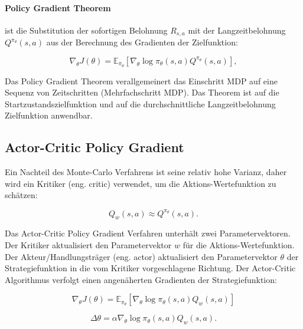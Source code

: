 \documentclass[conference]{IEEEtran}
\begin{document}
\paragraph*{Policy Gradient Theorem} ist die Substitution der sofortigen Belohnung $R_{s,a}$ mit der Langzeitbelohnung $Q^{\pi_\theta}(s,a)$ aus der Berechnung des Gradienten der Zielfunktion:

\begin{equation*}
\nabla_\theta J(\theta) = \mathbb{E}_{\pi_\theta}[\nabla_\theta \log \pi_\theta(s,a) Q^{\pi_\theta}(s,a)],
\end{equation*}

Das Policy Gradient Theorem verallgemeinert das Einschritt MDP auf eine Sequenz von Zeitschritten (Mehrfachschritt MDP). Das Theorem ist auf die Startzustandszielfunktion und auf die durchschnittliche Langzeitbelohnung Zielfunktion anwendbar.

\subsection{Actor-Critic Policy Gradient}
Ein Nachteil des Monte-Carlo Verfahrens ist seine relativ hohe Varianz, daher wird ein Kritiker (eng. critic) verwendet, um die Aktions-Wertefunktion zu schätzen:

\begin{equation*}
Q_w(s,a) \approx Q^{\pi_\theta} (s,a).
\end{equation*}

Das Actor-Critic Policy Gradient Verfahren unterhält zwei Parametervektoren. Der Kritiker aktualisiert den Parametervektor $w$ für die Aktions-Wertefunktion. Der Akteur/Handlungsträger (eng. actor) aktualisiert den Parametervektor $\theta$ der Strategiefunktion in die vom Kritiker vorgeschlagene Richtung. Der Actor-Critic Algorithmus verfolgt einen angenäherten Gradienten der Strategiefunktion:

\begin{equation*}
\nabla_\theta J(\theta) = \mathbb{E}_{\pi_\theta}[\nabla_\theta \log \pi_\theta(s,a) Q_w(s,a)]
\end{equation*}

\begin{equation*}
\Delta \theta = \alpha \nabla_\theta \log \pi_\theta (s,a) Q_w(s,a).
\end{equation*}



\end{document}
